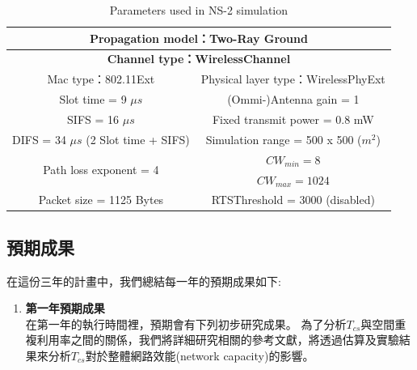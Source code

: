 \documentclass[12pt,a4paper]{article}
\newcommand{\Tab}[1]{表~\ref{#1}}
\begin{document}
\begin{description}
\begin{enumerate}
\begin{table}[!htb]
\centering
\caption{Parameters used in NS-2 simulation}
\vspace{0.2cm}
\small
\begin{tabular}{|c|c|}
\hline
\multicolumn{2}{|c|}{\bf{Propagation model：Two-Ray Ground}}\\
\hline
\multicolumn{2}{|c|}{\bf{Channel type：WirelessChannel}}\\
\hline
\hline
Mac type：802.11Ext & Physical layer type：WirelessPhyExt \\
\hline
Slot time = 9 $\mu s$ & (Ommi-)Antenna gain = 1 \\
\hline
SIFS = 16 $\mu s$ & Fixed transmit power = 0.8 mW \\
\hline
DIFS = 34 $\mu s$ (2 Slot time + SIFS) & Simulation range = 500 x 500 ($m^2$) \\
\hline
\multirow{2}{*}{Path loss exponent = 4} & $CW_{min} = 8$\\
                                  &$CW_{max} = 1024$\\
\hline
Packet size = 1125 Bytes & RTSThreshold = 3000 (disabled)\\
\hline
\end{tabular}
\label{tab:ns2-parameter}
\end{table}



\end{enumerate}


\subsection{預期成果}

在這份三年的計畫中，我們總結每一年的預期成果如下: 

\begin{enumerate}
\setlength\parindent{2em}
\item [\textbullet]	{\textbf{\Kai 第一年預期成果}}\\

在第一年的執行時間裡，預期會有下列初步研究成果。
為了分析$T_{cs}$與空間重複利用率之間的關係，我們將詳細研究相關的參考文獻，將透過估算及實驗結果來分析$T_{cs}$對於整體網路效能(network capacity)的影響。


\end{enumerate}
\end{description}
\end{document}
